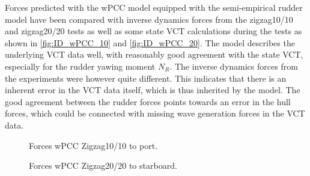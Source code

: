 Forces predicted with the wPCC model equipped with the semi-empirical rudder model have been compared with inverse dynamics forces from the zigzag10/10 and zigzag20/20 tests as well as some state VCT calculations during the tests as shown in \autoref{fig:ID_wPCC_10} and \autoref{fig:ID_wPCC_20}. The model describes the underlying VCT data well, with reasonably good agreement with the state VCT, especially for the rudder yawing moment $N_R$. The inverse dynamics forces from the experiments were however quite different. This indicates that there is an inherent error in the VCT data itself, which is thus inherited by the model. The good agreement between the rudder forces points towards an error in the hull forces, which could be connected with missing wave generation forces in the VCT data.  
\begin{figure}[h]
     \centering
     
     \caption{Forces wPCC Zigzag10/10 to port.}
     \label{fig:ID_wPCC_10}
\end{figure}
\begin{figure}[h]
    
    \caption{Forces wPCC Zigzag20/20 to starboard.}
    \label{fig:ID_wPCC_20}
\end{figure}
%         
%         
